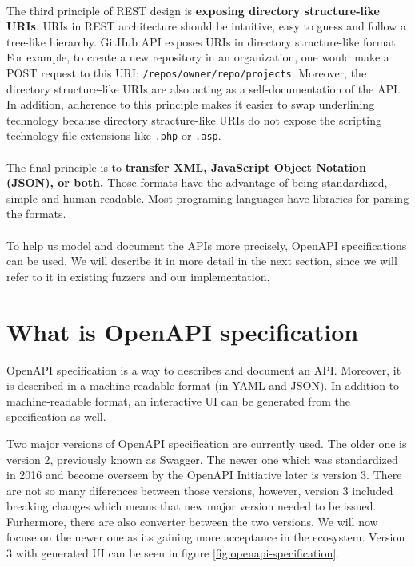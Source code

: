 \paragraph{}
The third principle of REST design is \textbf{exposing directory structure-like URIs}. URIs in REST architecture should be intuitive, easy to guess and follow a tree-like hierarchy. GitHub API exposes URIs in directory stracture-like format. For example, to create a new repository in an organization, one would make a POST request to this URI: \texttt{/repos/{owner}/{repo}/projects}. Moreover, the directory structure-like URIs are also acting as a self-documentation of the API. In addition, adherence to this principle makes it easier to swap underlining technology because directory stracture-like URIs do not expose the scripting technology file extensions like \texttt{.php} or \texttt{.asp}.

\paragraph{}
The final principle is to \textbf{transfer XML, JavaScript Object Notation (JSON), or both.} Those formats have the advantage of being standardized, simple and human readable. Most programing languages have libraries for parsing the formats.

\paragraph{}
To help us model and document the APIs more precisely, OpenAPI specifications can be used. We will describe it in more detail in the next section, since we will refer to it in existing fuzzers and our implementation.


\section{What is OpenAPI specification}
\label{sec:openapi}
OpenAPI specification is a way to describes and document an API. Moreover, it is described in a  machine-readable format (in YAML and JSON). In addition to machine-readable format, an interactive UI can be generated from the specification as well.

Two major versions of OpenAPI specification are currently used. The older one is version 2, previously known as Swagger. The newer one which was standardized in 2016 and become overseen by the OpenAPI Initiative \cite{openapi2020main} later is version 3. There are not so many diferences between those versions, however, version 3 included breaking changes which means that new major version needed to be issued. Furhermore, there are also converter between the two versions. We will now focuse on the newer one as its gaining more acceptance in the ecosystem. Version 3 with generated UI can be seen in figure \ref{fig:openapi-specification}.

